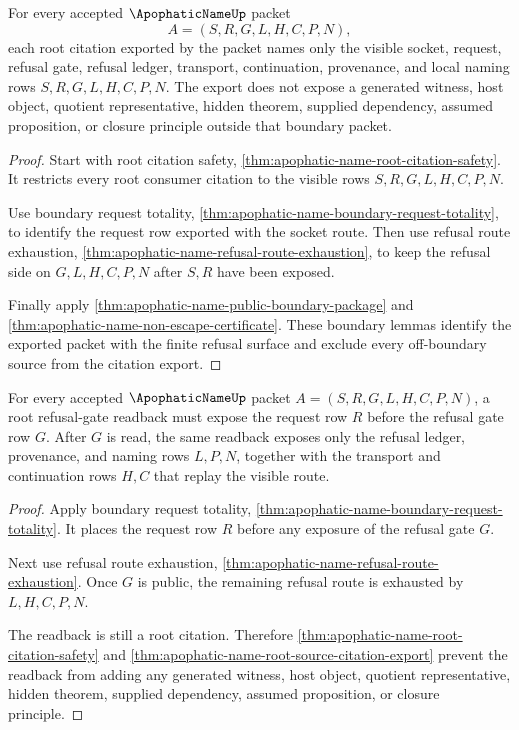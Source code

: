 \begin{theorem}
\label{thm:apophatic-name-root-source-citation-export}
For every accepted $\ApophaticNameUp$ packet
$$
A=(S,R,G,L,H,C,P,N),
$$
each root citation exported by the packet names only the visible socket, request, refusal gate, refusal ledger, transport, continuation, provenance, and local naming rows $S,R,G,L,H,C,P,N$. The export does not expose a generated witness, host object, quotient representative, hidden theorem, supplied dependency, assumed proposition, or closure principle outside that boundary packet.
\end{theorem}
\begin{proof}
Start with root citation safety, \autoref{thm:apophatic-name-root-citation-safety}. It restricts every root consumer citation to the visible rows $S,R,G,L,H,C,P,N$.

Use boundary request totality, \autoref{thm:apophatic-name-boundary-request-totality}, to identify the request row exported with the socket route. Then use refusal route exhaustion, \autoref{thm:apophatic-name-refusal-route-exhaustion}, to keep the refusal side on $G,L,H,C,P,N$ after $S,R$ have been exposed.

Finally apply \autoref{thm:apophatic-name-public-boundary-package} and \autoref{thm:apophatic-name-non-escape-certificate}. These boundary lemmas identify the exported packet with the finite refusal surface and exclude every off-boundary source from the citation export.
\end{proof}

\begin{theorem}
\label{thm:apophatic-name-root-refusal-gate-readback}
For every accepted $\ApophaticNameUp$ packet $A=(S,R,G,L,H,C,P,N)$, a root refusal-gate readback must expose the request row $R$ before the refusal gate row $G$. After $G$ is read, the same readback exposes only the refusal ledger, provenance, and naming rows $L,P,N$, together with the transport and continuation rows $H,C$ that replay the visible route.
\end{theorem}
\begin{proof}
Apply boundary request totality, \autoref{thm:apophatic-name-boundary-request-totality}. It places the request row $R$ before any exposure of the refusal gate $G$.

Next use refusal route exhaustion, \autoref{thm:apophatic-name-refusal-route-exhaustion}. Once $G$ is public, the remaining refusal route is exhausted by $L,H,C,P,N$.

The readback is still a root citation. Therefore \autoref{thm:apophatic-name-root-citation-safety} and \autoref{thm:apophatic-name-root-source-citation-export} prevent the readback from adding any generated witness, host object, quotient representative, hidden theorem, supplied dependency, assumed proposition, or closure principle.
\end{proof}

